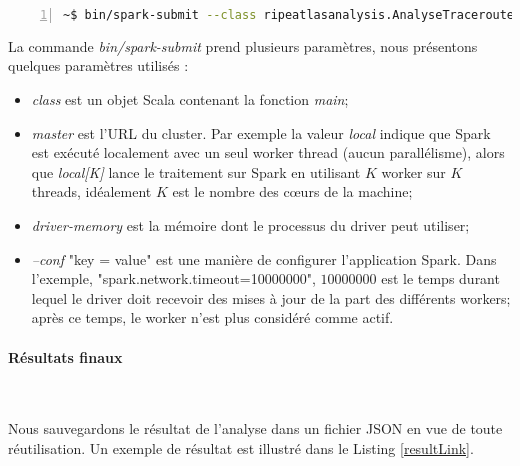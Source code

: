 \begin{lstlisting}[language=bash,firstnumber=1, caption={Exemple de la soumissions d'un traitement sur Spark},label={lst:submit}, basicstyle = \small,escapechar=|,numbers=left,
stepnumber=1]
~$ bin/spark-submit --class ripeatlasanalysis.AnalyseTraceroute     --master local --driver-memory 30G  --conf "spark.network.timeout=10000000" DelayAnalysis-0.0.5-SNAPSHOT-jar-with-dependencies.jar  1517961600  1518134400 3600 
\end{lstlisting}
La commande \textit{bin/spark-submit} prend plusieurs paramètres, nous présentons quelques paramètres utilisés :
\begin{itemize}
	\item \textit{class} est un objet Scala contenant la fonction \textit{main};
	\item  \textit{master} est l'URL du cluster. Par exemple la valeur \textit{local} indique que Spark est exécuté localement avec un seul worker thread (aucun parallélisme), alors que \textit{local[K]} lance le traitement sur Spark en utilisant $K$ worker sur $K$ threads, idéalement $K$ est le nombre des  c\oe{}urs de la machine;
	\item \textit{driver-memory} est la mémoire dont le processus du driver peut utiliser;
	
	\item  \textit{--conf} "key = value" est une manière de configurer l'application Spark. Dans l'exemple, "spark.network.timeout=10000000", $ 10000000 $ est le temps durant lequel le driver doit recevoir  des mises à jour de la part des différents workers; après ce temps, le worker n'est plus considéré comme actif.
\end{itemize}

\paragraph{Résultats finaux}~

Nous sauvegardons le résultat de l'analyse dans un fichier JSON en vue de toute réutilisation. Un exemple de résultat est illustré dans le Listing \ref{resultLink}.

